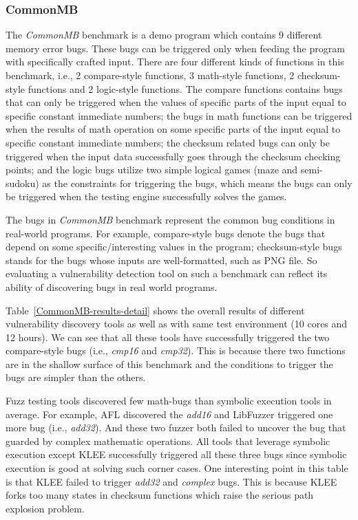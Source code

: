\subsubsection{CommonMB}
\noindent The \emph{CommonMB} benchmark is a demo program which contains 
9 different memory error bugs. These bugs can be triggered only when 
feeding the program with specifically crafted input. There are four 
different kinds of functions in this benchmark, i.e., 2 compare-style 
functions, 3 math-style functions, 2 checksum-style functions and 2 
logic-style functions. The compare functions contains bugs that can 
only be triggered when the values of specific parts of the input equal 
to specific constant immediate numbers; the bugs in math functions 
can be triggered when the results of math operation on some specific 
parts of the input equal to specific constant immediate numbers; the 
checksum related bugs can only be triggered when the input data 
successfully goes through the checksum checking points; and the logic 
bugs utilize two simple logical games (maze and semi-sudoku) as the 
constraints for triggering the bugs, which means the bugs can only be 
triggered when the testing engine successfully solves the games.

The bugs in \emph{CommonMB} benchmark represent the common bug conditions 
in real-world programs. For example, compare-style bugs denote the bugs 
that depend on some specific/interesting values in the program; 
checksum-style bugs stands for the bugs whose inputs are well-formatted, 
such as PNG file.
So evaluating a vulnerability detection tool on such a benchmark can 
reflect its ability of discovering bugs in real world programs.

Table~\ref{CommonMB-results-detail} shows the overall results of 
different vulnerability discovery tools as well as \prototype 
with same test environment (10 cores and 12 hours).
We can see that all these tools have successfully triggered the 
two compare-style bugs (i.e., \textit{cmp16} and \textit{cmp32}). 
This is because there two functions are in the shallow surface of 
this benchmark and the conditions to trigger the bugs are simpler 
than the others.  

Fuzz testing tools discovered few math-bugs than symbolic execution 
tools in average.
For example, AFL discovered the \textit{add16} and LibFuzzer triggered 
one more bug (i.e., \textit{add32}). And these two fuzzer both failed 
to uncover the bug that guarded by complex mathematic operations. 
All tools that leverage symbolic execution except KLEE successfully 
triggered all these three bugs since symbolic execution is good at 
solving such corner cases. One interesting point in this table is that 
KLEE failed to trigger \textit{add32} and \textit{complex} bugs. 
This is because KLEE forks too many states in checksum functions 
which raise the serious path explosion problem. 

